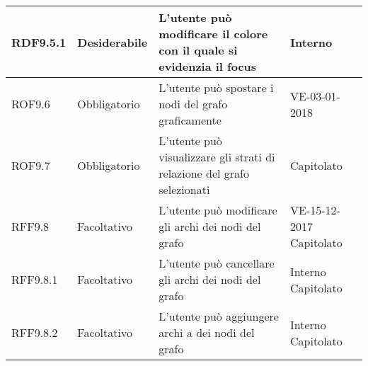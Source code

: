 \documentclass[../AnalisideiRequisiti.tex]{subfiles}
\begin{document}
\begin{longtable}{| p{2cm} | p{2.5cm} |p{5cm} | p{2.5cm} |}
		\newline RDF9.5.1&\newline Desiderabile&
		\newline L'utente può modificare il colore con il quale si evidenzia il focus&
		\newline Interno
		\\[1em]
		\hline
		
		\newline ROF9.6&\newline Obbligatorio&
		\newline L'utente può spostare i nodi del grafo graficamente&
		\newline {}{UC13.2} \newline VE-03-01-2018
		\\[1em]
		\hline
		
		\newline ROF9.7&\newline Obbligatorio&
		\newline L'utente può visualizzare gli strati di relazione del grafo selezionati&
		\newline {}{UC13.5} \newline Capitolato
		\\[1em]
		\hline
	
		\newline RFF9.8&\newline Facoltativo&
		\newline L'utente può modificare gli archi dei nodi del grafo&
		\newline  VE-15-12-2017 \newline Capitolato
		\\[1em]
		\hline
		
		\newline RFF9.8.1&\newline Facoltativo&
		\newline L'utente può cancellare gli archi dei nodi del grafo&
		\newline Interno \newline Capitolato
		\\[1em]
		\hline
		
		\newline RFF9.8.2&\newline Facoltativo&
		\newline L'utente può aggiungere archi a dei nodi del grafo&
		\newline Interno \newline Capitolato
		\\[1em]
		\hline
		

\end{longtable}
\end{document}
